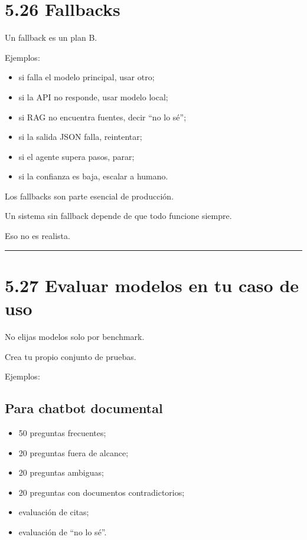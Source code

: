 \section{5.26 Fallbacks}\label{fallbacks}

Un fallback es un plan B.

Ejemplos:

\begin{itemize}
\tightlist
\item
  si falla el modelo principal, usar otro;
\item
  si la API no responde, usar modelo local;
\item
  si RAG no encuentra fuentes, decir ``no lo sé'';
\item
  si la salida JSON falla, reintentar;
\item
  si el agente supera pasos, parar;
\item
  si la confianza es baja, escalar a humano.
\end{itemize}

Los fallbacks son parte esencial de producción.

Un sistema sin fallback depende de que todo funcione siempre.

Eso no es realista.

\begin{center}\rule{0.5\linewidth}{0.5pt}\end{center}

\section{5.27 Evaluar modelos en tu caso de
uso}\label{evaluar-modelos-en-tu-caso-de-uso}

No elijas modelos solo por benchmark.

Crea tu propio conjunto de pruebas.

Ejemplos:

\subsection{Para chatbot documental}\label{para-chatbot-documental}

\begin{itemize}
\tightlist
\item
  50 preguntas frecuentes;
\item
  20 preguntas fuera de alcance;
\item
  20 preguntas ambiguas;
\item
  20 preguntas con documentos contradictorios;
\item
  evaluación de citas;
\item
  evaluación de ``no lo sé''.
\end{itemize}

